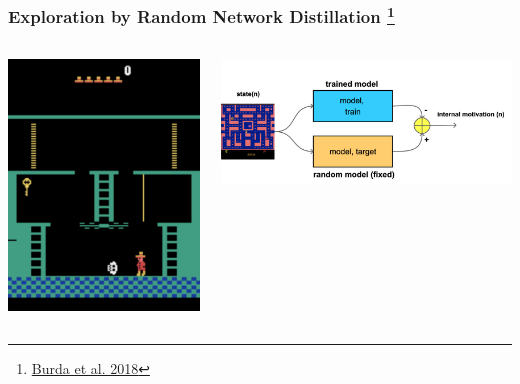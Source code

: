 \documentclass{beamer}
\begin{document}
 


  \begin{frame}
  
    \frametitle{Exploration by Random Network Distillation \footnote{\href{https://arxiv.org/pdf/1810.12894.pdf}{Burda et al. 2018}}}
  
    \begin{columns}
  
      
      \begin{column}{0.5\textwidth}
        \centering
        \includegraphics[scale=0.3]{../images/montezuma.png}
      \end{column}

      \begin{column}{0.5\textwidth}
        \centering
        \includegraphics[scale=0.12]{../diagrams/internal_motivation/rnd.png}
      \end{column}
  
    
    \end{columns}
  
  
  \end{frame}
  
\end{document}
